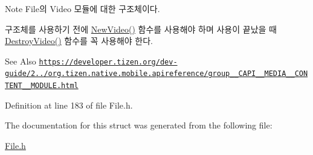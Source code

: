 \begin{DoxyNote}{Note}
File의 Video 모듈에 대한 구조체이다. \par
 구조체를 사용하기 전에 \hyperlink{File_8h_acc20c940b38ba0ace77f77a2992dea58}{New\-Video()} 함수를 사용해야 하며 사용이 끝났을 때 \hyperlink{File_8h_a23fb13c9330e924604c6d93e67e957c6}{Destroy\-Video()} 함수를 꼭 사용해야 한다. 
\end{DoxyNote}
\begin{DoxySeeAlso}{See Also}
\href{https://developer.tizen.org/dev-guide/2.3.0/org.tizen.native.mobile.apireference/group__CAPI__MEDIA__CONTENT__MODULE.html}{\tt https\-://developer.\-tizen.\-org/dev-\/guide/2../org.\-tizen.\-native.\-mobile.\-apireference/group\-\_\-\-\_\-\-C\-A\-P\-I\-\_\-\-\_\-\-M\-E\-D\-I\-A\-\_\-\-\_\-\-C\-O\-N\-T\-E\-N\-T\-\_\-\-\_\-\-M\-O\-D\-U\-L\-E.\-html} 
\end{DoxySeeAlso}


Definition at line 183 of file File.\-h.



The documentation for this struct was generated from the following file\-:\begin{DoxyCompactItemize}
\item 
\hyperlink{File_8h}{File.\-h}\end{DoxyCompactItemize}
